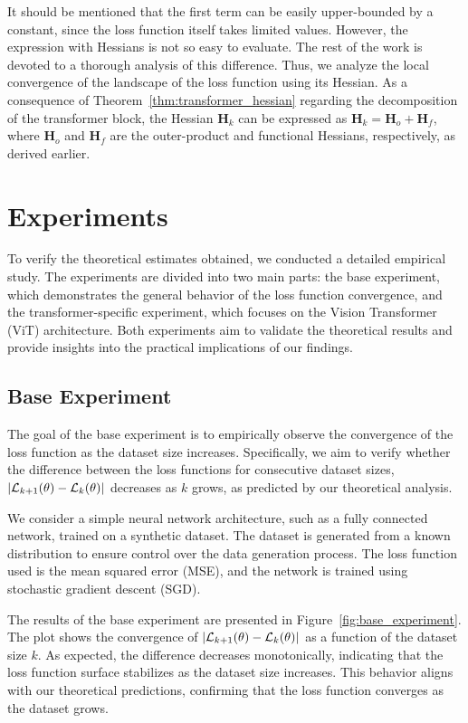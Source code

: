 \documentclass{article}
\begin{document}
It should be mentioned that the first term can be easily upper-bounded by a constant, since the loss function itself takes limited values. However, the expression with Hessians is not so easy to evaluate. The rest of the work is devoted to a thorough analysis of this difference. Thus, we analyze the local convergence of the landscape of the loss function using its Hessian. As a consequence of Theorem~\ref{thm:transformer_hessian} regarding the decomposition of the transformer block, the Hessian \(\mathbf{H}_k\) can be expressed as \(\mathbf{H}_k = \mathbf{H}_o + \mathbf{H}_f\), where \(\mathbf{H}_o\) and \(\mathbf{H}_f\) are the outer-product and functional Hessians, respectively, as derived earlier.

\section{Experiments}\label{sec:exp}

To verify the theoretical estimates obtained, we conducted a detailed empirical study. The experiments are divided into two main parts: the base experiment, which demonstrates the general behavior of the loss function convergence, and the transformer-specific experiment, which focuses on the Vision Transformer (ViT) architecture. Both experiments aim to validate the theoretical results and provide insights into the practical implications of our findings.

\subsection{Base Experiment}

The goal of the base experiment is to empirically observe the convergence of the loss function as the dataset size increases. Specifically, we aim to verify whether the difference between the loss functions for consecutive dataset sizes, $|\mathcal{L}_{k + 1}(\theta) - \mathcal{L}_{k}(\theta)|$
decreases as $k$ grows, as predicted by our theoretical analysis.

We consider a simple neural network architecture, such as a fully connected network, trained on a synthetic dataset. The dataset is generated from a known distribution to ensure control over the data generation process. The loss function used is the mean squared error (MSE), and the network is trained using stochastic gradient descent (SGD).

The results of the base experiment are presented in Figure~\ref{fig:base_experiment}. The plot shows the convergence of $|\mathcal{L}_{k + 1}(\theta) - \mathcal{L}_{k}(\theta)|$ as a function of the dataset size $k$. As expected, the difference decreases monotonically, indicating that the loss function surface stabilizes as the dataset size increases. This behavior aligns with our theoretical predictions, confirming that the loss function converges as the dataset grows.
\end{document}
